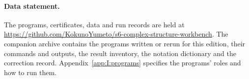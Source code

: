 \paragraph{Data statement.}
The programs, certificates, data and run records are held at
\url{https://github.com/KokunoYumeto/s6-complex-structure-workbench}.
The companion archive contains the programs written or rerun for this
edition, their commands and outputs, the result inventory, the notation
dictionary and the correction record. Appendix~\ref{app:I:programs}
specifies the programs' roles and how to run them.



